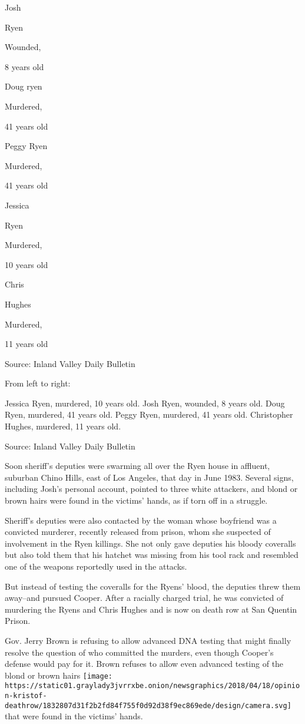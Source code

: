 Josh

Ryen

Wounded,

8 years old

Doug ryen

Murdered,

41 years old

Peggy Ryen

Murdered,

41 years old

Jessica

Ryen

Murdered,

10 years old

Chris

Hughes

Murdered,

11 years old

Source: Inland Valley Daily Bulletin

From left to right:

Jessica Ryen, murdered, 10 years old. Josh Ryen, wounded, 8 years old.
Doug Ryen, murdered, 41 years old. Peggy Ryen, murdered, 41 years old.
Christopher Hughes, murdered, 11 years old.

Source: Inland Valley Daily Bulletin

Soon sheriff's deputies were swarming all over the Ryen house in
affluent, suburban Chino Hills, east of Los Angeles, that day in June
1983. Several signs, including Josh's personal account, pointed to three
white attackers, and blond or brown hairs were found in the victims'
hands, as if torn off in a struggle.

Sheriff's deputies were also contacted by the woman whose boyfriend was
a convicted murderer, recently released from prison, whom she suspected
of involvement in the Ryen killings. She not only gave deputies his
bloody coveralls but also told them that his hatchet was missing from
his tool rack and resembled one of the weapons reportedly used in the
attacks.

But instead of testing the coveralls for the Ryens' blood, the deputies
threw them away--and pursued Cooper. After a racially charged trial, he
was convicted of murdering the Ryens and Chris Hughes and is now on
death row at San Quentin Prison.

Gov. Jerry Brown is refusing to allow advanced DNA testing that might
finally resolve the question of who committed the murders, even though
Cooper's defense would pay for it. Brown refuses to allow even advanced
testing of the blond or brown hairs
\texttt{[image: https://static01.graylady3jvrrxbe.onion/newsgraphics/2018/04/18/opinion-kristof-deathrow/1832807d31f2b2fd84f755f0d92d38f9ec869ede/design/camera.svg]}
that were found in the victims' hands.

